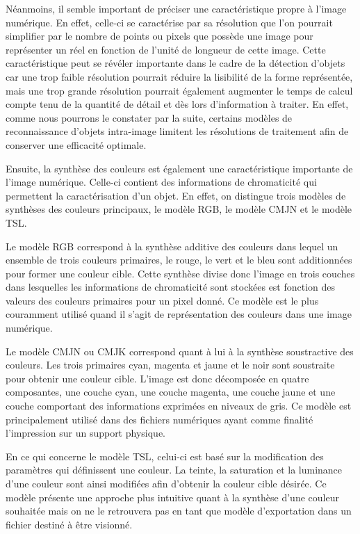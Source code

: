 \documentclass[a4paper,12pt]{article} %
\begin{document}
	Néanmoins, il semble important de préciser une caractéristique propre à l’image numérique. En effet, celle-ci se caractérise par sa résolution que l’on pourrait simplifier par le nombre de points ou pixels que possède une image pour représenter un réel en fonction de l’unité de longueur de cette image. Cette caractéristique peut se révéler importante dans le cadre de la détection d’objets car une trop faible résolution pourrait réduire la lisibilité de la forme représentée, mais une trop grande résolution pourrait également augmenter le temps de calcul compte tenu de la quantité de détail et dès lors d’information à traiter. En effet, comme nous pourrons le constater par la suite, certains modèles de reconnaissance d’objets intra-image limitent les résolutions de traitement afin de conserver une efficacité optimale. \newline
 \par
    Ensuite, la synthèse des couleurs est également une caractéristique importante de l'image numérique. Celle-ci contient des informations de chromaticité qui permettent la caractérisation d'un objet. En effet, on distingue trois modèles de synthèses des couleurs principaux, le modèle RGB, le modèle CMJN et le modèle TSL.\newpage
\par
Le modèle RGB correspond à la synthèse additive des couleurs dans lequel un ensemble de trois couleurs primaires, le rouge, le vert et le bleu sont additionnées pour former une couleur cible. Cette synthèse divise donc l’image en trois couches dans lesquelles les informations de chromaticité sont stockées est fonction des valeurs des couleurs primaires pour un pixel donné. Ce modèle est le plus couramment utilisé quand il s’agit de représentation des couleurs dans une image numérique.\newline
\par
Le modèle CMJN ou CMJK correspond quant à lui à la synthèse soustractive des couleurs. Les trois primaires cyan, magenta et jaune et le noir sont soustraite pour obtenir une couleur cible. L’image est donc décomposée en quatre composantes, une couche cyan, une couche magenta, une couche jaune et une couche comportant des informations exprimées en niveaux de gris. Ce modèle est principalement utilisé dans des fichiers numériques ayant comme finalité l’impression sur un support physique.\newline
\par
En ce qui concerne le modèle TSL, celui-ci est basé sur la modification des paramètres qui définissent une couleur. La teinte, la saturation et la luminance d’une couleur sont ainsi modifiées afin d’obtenir la couleur cible désirée. Ce modèle présente une approche plus intuitive quant à la synthèse d’une couleur souhaitée mais on ne le retrouvera pas en tant que modèle d’exportation dans un fichier destiné à être visionné.\newline
\end{document}
